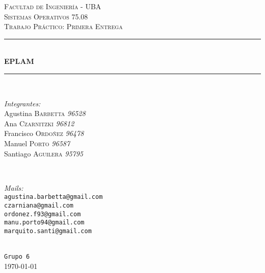 \documentclass[10pt,a4paper]{article}
\begin{document}


\begin{titlepage}

\newcommand{\HRule}{\rule{\linewidth}{0.5mm}} %

\center %

\textsc{\LARGE Facultad de Ingeniería - UBA}\\[1.5cm]
\textsc{\Large Sistemas Operativos 75.08}\\[0.5cm]
\textsc{\large Trabajo Práctico: Primera Entrega}\\[0.5cm]

\HRule \\[0.4cm]
{ \huge \bfseries EPLAM}\\[0.4cm]
\HRule \\[1.5cm]

\begin{minipage}{0.5\textwidth}
\begin{flushleft} \large
\emph{Integrantes:}\\
Agustina \textsc{Barbetta} \textit{96528}\\
Ana \textsc{Czarnitzki} \textit{96812}\\
Francisco \textsc{Ordoñez} \textit{96478}\\
Manuel \textsc{Porto} \textit{96587}\\
Santiago \textsc{Aguilera} \textit{95795}\\
\end{flushleft}
\end{minipage}
~
\begin{minipage}{0.4\textwidth}
\begin{flushright} \large
\emph{Mails:}\\
\texttt{agustina.barbetta@gmail.com}\\
\texttt{czarniana@gmail.com}\\
\texttt{ordonez.f93@gmail.com}\\
\texttt{manu.porto94@gmail.com}\\
\texttt{marquito.santi@gmail.com}\\
\end{flushright}
\end{minipage}\\[2cm]

{\Large \texttt{Grupo 6}}\\[2cm]

{\large \today}\\[3cm]



\vfill %

\end{titlepage}
\end{document}
